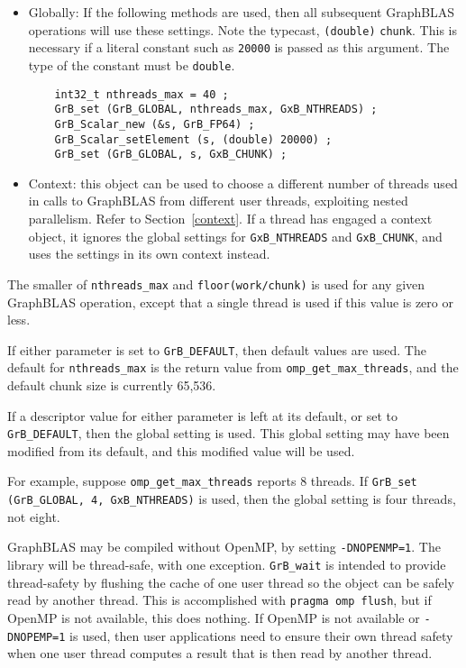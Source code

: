\begin{itemize}

\item Globally:  If the following methods are used, then all subsequent
GraphBLAS operations will use these settings.  Note the typecast,
\verb'(double)' \verb'chunk'.  This is necessary if a literal constant such as
\verb'20000' is passed as this argument.  The type of the constant must be
\verb'double'.

    {\footnotesize
    \begin{verbatim}
    int32_t nthreads_max = 40 ;
    GrB_set (GrB_GLOBAL, nthreads_max, GxB_NTHREADS) ;
    GrB_Scalar_new (&s, GrB_FP64) ;
    GrB_Scalar_setElement (s, (double) 20000) ;
    GrB_set (GrB_GLOBAL, s, GxB_CHUNK) ; \end{verbatim} }

\item Context: this object can be used to choose a different number of
threads used in calls to GraphBLAS from different user threads, exploiting
nested parallelism.  Refer to Section~\ref{context}.  If a thread has engaged a
context object, it ignores the global settings for \verb'GxB_NTHREADS' and
\verb'GxB_CHUNK', and uses the settings in its own context instead.

\end{itemize}

The smaller of \verb'nthreads_max' and \verb'floor(work/chunk)' is used for any
given GraphBLAS operation, except that a single thread is used if this value is
zero or less.

If either parameter is set to \verb'GrB_DEFAULT', then default values are used.
The default for \verb'nthreads_max' is the return value from
\verb'omp_get_max_threads', and the default chunk size is currently 65,536.

If a descriptor value for either parameter is left at its default, or set to
\verb'GrB_DEFAULT', then the global setting is used.  This global setting may
have been modified from its default, and this modified value will be used.

For example, suppose \verb'omp_get_max_threads' reports 8 threads.  If \newline
\verb'GrB_set (GrB_GLOBAL, 4, GxB_NTHREADS)' is used, then the global setting is four
threads, not eight.

GraphBLAS may be compiled without OpenMP, by setting \verb'-DNOPENMP=1'.
The library will be thread-safe, with one exception.  \verb'GrB_wait' is
intended to provide thread-safety by flushing the cache of one user thread
so the object can be safely read by another thread.  This is accomplished
with \verb'pragma omp flush', but if OpenMP is not available, this does
nothing.  If OpenMP is not available or \verb'-DNOPEMP=1' is used, then
user applications need to ensure their own thread safety when one user thread
computes a result that is then read by another thread.


